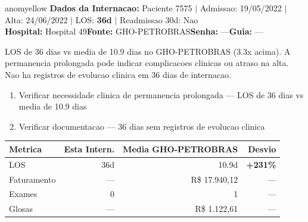 \documentclass[a4paper,10pt]{article}
\begin{document}
\begin{anomalycard}[Internacao 7536 | GHO-PETROBRAS | MODERADO (z=2.33)]{anomyellow}
\textbf{Dados da Internacao:} Paciente 7575 $\mid$ Admissao: 19/05/2022 $\mid$ Alta: 24/06/2022 $\mid$ LOS: \textbf{36d} $\mid$ Readmissao 30d: Nao\\
\textbf{Hospital:} Hospital 49\quad\textbf{Fonte:} GHO-PETROBRAS\quad\textbf{Senha:} ---\quad\textbf{Guia:} ---\\
\vspace{2pt}\begin{tcolorbox}[colback=severityred!20,colframe=anomyellow,title={\textbf{Interpretacao de Negocio}},fonttitle=\bfseries\small,left=4pt,right=4pt,top=3pt,bottom=3pt]
{\small LOS de 36 dias vs media de 10.9 dias no GHO-PETROBRAS (3.3x acima). A permanencia prolongada pode indicar complicacoes clinicas ou atraso na alta. Nao ha registros de evolucao clinica em 36 dias de internacao.}
\end{tcolorbox}
\begin{tcolorbox}[colback=severityyellow!30,colframe=anomorange,title={\textbf{Recomendacoes Especificas}},fonttitle=\bfseries\small,left=4pt,right=4pt,top=3pt,bottom=3pt]
\begin{enumerate}[nosep,leftmargin=16pt]
\item {\small Verificar necessidade clinica de permanencia prolongada --- LOS de 36 dias vs media de 10.9 dias}
\item {\small Verificar documentacao --- 36 dias sem registros de evolucao clinica}
\end{enumerate}
\end{tcolorbox}
\begin{center}\begin{tabular}{l r r r}\toprule\textbf{Metrica} & \textbf{Esta Intern.} & \textbf{Media GHO-PETROBRAS} & \textbf{Desvio} \\\midrule
LOS & 36d & 10.9d & \textcolor{anomred}{\textbf{+231\%}} \\
Faturamento & --- & R\$ 17.940,12 & --- \\
Exames & 0 & 1 & --- \\
Glosas & --- & R\$ 1.122,61 & --- \\
\bottomrule\end{tabular}\end{center}


\end{anomalycard}
\end{document}
